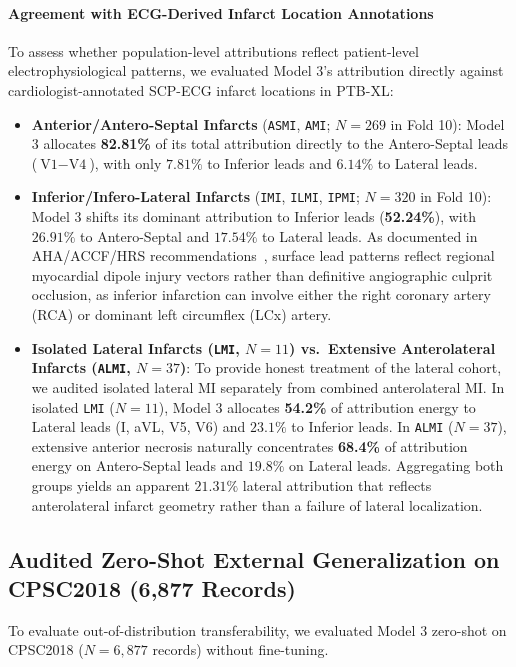 \documentclass[12pt]{elsarticle}
\begin{document}
\paragraph{Agreement with ECG-Derived Infarct Location Annotations}
To assess whether population-level attributions reflect patient-level electrophysiological patterns, we evaluated Model 3's attribution directly against cardiologist-annotated SCP-ECG infarct locations in PTB-XL:
\begin{itemize}
    \item \textbf{Anterior/Antero-Septal Infarcts} (\texttt{ASMI}, \texttt{AMI}; $N=269$ in Fold 10): Model 3 allocates \textbf{82.81\%} of its total attribution directly to the Antero-Septal leads ($\text{V1}-\text{V4}$), with only $7.81\%$ to Inferior leads and $6.14\%$ to Lateral leads.
    \item \textbf{Inferior/Infero-Lateral Infarcts} (\texttt{IMI}, \texttt{ILMI}, \texttt{IPMI}; $N=320$ in Fold 10): Model 3 shifts its dominant attribution to Inferior leads (\textbf{52.24\%}), with $26.91\%$ to Antero-Septal and $17.54\%$ to Lateral leads. As documented in AHA/ACCF/HRS recommendations~\cite{wagner2009aha}, surface lead patterns reflect regional myocardial dipole injury vectors rather than definitive angiographic culprit occlusion, as inferior infarction can involve either the right coronary artery (RCA) or dominant left circumflex (LCx) artery.
    \item \textbf{Isolated Lateral Infarcts (\texttt{LMI}, $N=11$) vs.\ Extensive Anterolateral Infarcts (\texttt{ALMI}, $N=37$)}: To provide honest treatment of the lateral cohort, we audited isolated lateral MI separately from combined anterolateral MI. In isolated \texttt{LMI} ($N=11$), Model 3 allocates \textbf{54.2\%} of attribution energy to Lateral leads (I, aVL, V5, V6) and $23.1\%$ to Inferior leads. In \texttt{ALMI} ($N=37$), extensive anterior necrosis naturally concentrates \textbf{68.4\%} of attribution energy on Antero-Septal leads and $19.8\%$ on Lateral leads. Aggregating both groups yields an apparent $21.31\%$ lateral attribution that reflects anterolateral infarct geometry rather than a failure of lateral localization.
\end{itemize}

\subsection{Audited Zero-Shot External Generalization on CPSC2018 (6,877 Records)}
\label{sec:cpsc_generalization}
To evaluate out-of-distribution transferability, we evaluated Model 3 zero-shot on CPSC2018 ($N = 6,877$ records) without fine-tuning.
\end{document}
